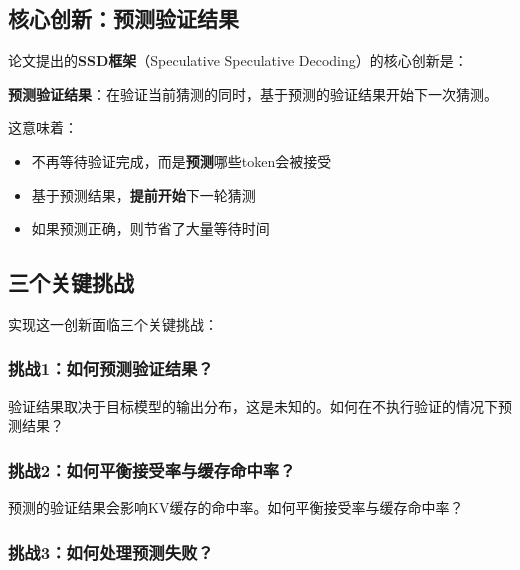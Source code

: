 \documentclass[11pt,a4paper]{article}
\newcommand{\hlpurple}[1]{\textcolor{primarypurple}{\textbf{#1}}}
\newcommand{\term}[1]{\textcolor{primarypurple}{\textbf{#1}}}
\begin{document}
\subsection{核心创新：预测验证结果}

论文提出的\term{SSD框架}（Speculative Speculative Decoding）的核心创新是：

\begin{innovationbox}[核心创新]
  \textbf{预测验证结果}：在验证当前猜测的同时，基于预测的验证结果开始下一次猜测。
\end{innovationbox}

这意味着：

\begin{itemize}
  \item 不再等待验证完成，而是\hlpurple{预测}哪些token会被接受
  \item 基于预测结果，\hlpurple{提前开始}下一轮猜测
  \item 如果预测正确，则节省了大量等待时间
\end{itemize}

\subsection{三个关键挑战}

实现这一创新面临三个关键挑战：

\subsubsection{挑战1：如何预测验证结果？}

\begin{conceptbox}[问题]
  验证结果取决于目标模型的输出分布，这是未知的。如何在不执行验证的情况下预测结果？
\end{conceptbox}

\subsubsection{挑战2：如何平衡接受率与缓存命中率？}

\begin{conceptbox}[问题]
  预测的验证结果会影响KV缓存的命中率。如何平衡接受率与缓存命中率？
\end{conceptbox}

\subsubsection{挑战3：如何处理预测失败？}
\end{document}
